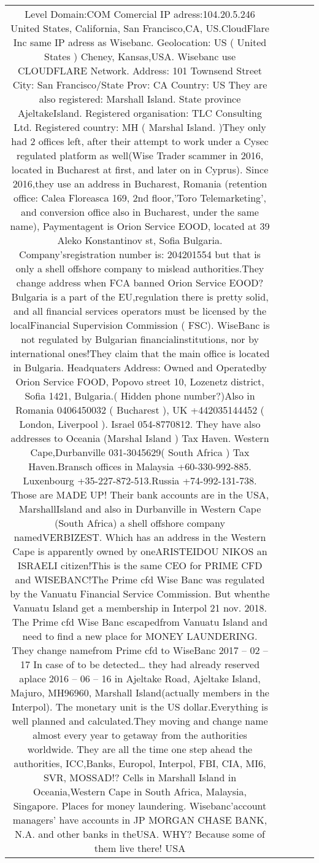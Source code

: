 \documentclass[11pt]{article}
\newlength\mylength
\begin{document}
\begin{center}
\begin{longtable}{|C{.65\mylength}|C{.30\mylength}|C{.12\mylength}|C{.12\mylength}|C{.12\mylength}|}
Level Domain:COM Comercial IP adress:104.20.5.246 United States, California, San Francisco,CA, US.CloudFlare Inc same IP adress as Wisebanc. Geolocation: US ( United States ) Cheney, Kansas,USA. Wisebanc use CLOUDFLARE Network. Address: 101 Townsend Street City: San Francisco/State Prov: CA Country: US They are also registered: Marshall Island. State province AjeltakeIsland. Registered organisation: TLC Consulting Ltd. Registered country: MH ( Marshal Island. )They only had 2 offices left, after their attempt to work under a Cysec regulated platform as well(Wise Trader scammer in 2016, located in Bucharest at first, and later on in Cyprus). Since 2016,they use an address in Bucharest, Romania (retention office: Calea Floreasca 169, 2nd floor,'Toro Telemarketing', and conversion office also in Bucharest, under the same name), Paymentagent is Orion Service EOOD, located at 39 Aleko Konstantinov st, Sofia Bulgaria. Company'sregistration number is: 204201554 but that is only a shell offshore company to mislead authorities.They change address when FCA banned Orion Service EOOD? Bulgaria is a part of the EU,regulation there is pretty solid, and all financial services operators must be licensed by the localFinancial Supervision Commission ( FSC). WiseBanc is not regulated by Bulgarian financialinstitutions, nor by international ones!They claim that the main office is located in Bulgaria. Headquaters Address: Owned and Operatedby Orion Service FOOD, Popovo street 10, Lozenetz district, Sofia 1421, Bulgaria.( Hidden phone number?)Also in Romania 0406450032 ( Bucharest ), UK +442035144452 ( London, Liverpool ). Israel 054-8770812. They have also addresses to Oceania (Marshal Island ) Tax Haven. Western Cape,Durbanville 031-3045629( South Africa ) Tax Haven.Bransch offices in Malaysia +60-330-992-885. Luxenbourg +35-227-872-513.Russia +74-992-131-738. Those are MADE UP! Their bank accounts are in the USA, MarshallIsland and also in Durbanville in Western Cape (South Africa) a shell offshore company namedVERBIZEST. Which has an address in the Western Cape is apparently owned by oneARISTEIDOU NIKOS an ISRAELI citizen!This is the same CEO for PRIME CFD and WISEBANC!The Prime cfd Wise Banc was regulated by the Vanuatu Financial Service Commission. But whenthe Vanuatu Island get a membership in Interpol 21 nov. 2018. The Prime cfd Wise Banc escapedfrom Vanuatu Island and need to find a new place for MONEY LAUNDERING. They change namefrom Prime cfd to WiseBanc 2017 – 02 – 17 In case of to be detected… they had already reserved aplace 2016 – 06 – 16 in Ajeltake Road, Ajeltake Island, Majuro, MH96960, Marshall Island(actually members in the Interpol). The monetary unit is the US dollar.Everything is well planned and calculated.They moving and change name almost every year to getaway from the authorities worldwide. They are all the time one step ahead the authorities, ICC,Banks, Europol, Interpol, FBI, CIA, MI6, SVR, MOSSAD!? Cells in Marshall Island in Oceania,Western Cape in South Africa, Malaysia, Singapore. Places for money laundering. Wisebanc'account managers' have accounts in JP MORGAN CHASE BANK, N.A. and other banks in theUSA. WHY? Because some of them live there! USA 
\end{longtable}
\end{center}
\end{document}
